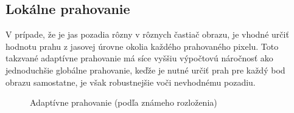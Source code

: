 \subsection{Lokálne prahovanie}

    V prípade, že je jas pozadia rôzny v rôznych častiač obrazu, je vhodné určiť hodnotu prahu z jasovej úrovne okolia každého prahovaného pixelu. Toto takzvané adaptívne prahovanie má síce vyššiu výpočtovú náročnosť ako jednoduchšie globálne prahovanie, keďže je nutné určiť prah pre každý bod obrazu samostatne, je však robustnejšie voči nevhodnému pozadiu. \cite{Buhl2023}

    \begin{figure}[!ht]
        \centering
        \caption{Adaptívne prahovanie (podľa známeho rozloženia)}
    \end{figure}


